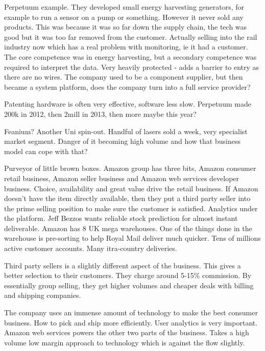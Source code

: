 Perpetuum example. They developed small energy harvesting generators, for example to run a sensor on a pump or something. However it never sold any products. This was because it was so far down the supply chain, the tech was good but it was too far removed from the customer. Actually selling into the rail industry now which has a real problem with monitoring, ie it had a customer. The core competence was in energy harvesting, but a secondary competence was required to interpret the data. Very heavily protected - adds a barrier to entry as there are no wires. The company used to be a component supplier, but then became a system platform, does the company turn into a full service provider? 

Patenting hardware is often very effective, software less slow. Perpetuum made 200k in 2012, then 2mill in 2013, then more maybe this year?

Feanium? Another Uni spin-out. Handful of lasers sold a week, very specialist market segment. Danger of it becoming high volume and how that business model can cope with that?



Purveyor of little brown boxes. Amazon group has three bits, Amazon consumer retail business, Amazon seller business and Amazon web services developer business. Choice, availability and great value drive the retail business. If Amazon doesn't have the item directly available, then they put a third party seller into the prime selling position to make sure the customer is satisfied. Analytics under the platform. Jeff Bezzos wants reliable stock prediction for almost instant deliverable. Amazon has 8 UK mega warehouses. One of the things done in the warehouse is pre-sorting to help Royal Mail deliver much quicker. Tens of millions active customer accounts. Many itra-country deliveries.

Third party sellers is a slightly different aspect of the business. This gives a better selection to their customers. They charge around 5-15\% commission. By essentially group selling, they get higher volumes and cheaper deals with billing and shipping companies. 

The company uses an immense amount of technology to make the best consumer business. How to pick and ship more efficiently. User analytics is very important. Amazon web services powers the other two parts of the business. Takes a high volume low margin approach to technology which is against the flow slightly. 

